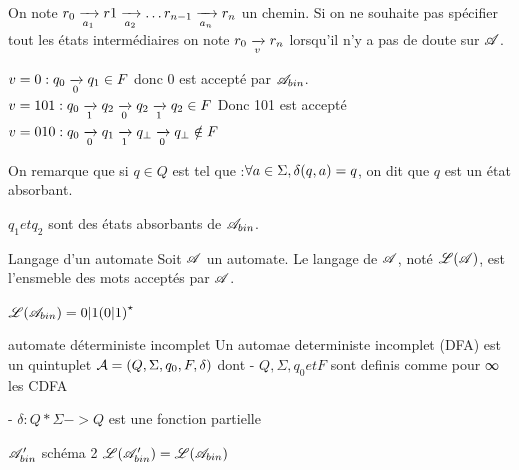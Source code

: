 \documentclass[a4paper,french,bookmarks]{book}
\begin{document}
    \begin{notation}
        \begin{enumerate}
            \itt On note $r_0\lima{a_1} r1 \lima{a_2} \dots r_{n - 1} \lima{a_n} r_n$ un chemin.
            \itt Si on ne souhaite pas spécifier tout les états intermédiaires on note $r_0 \lima{v} r_n$ lorsqu'il n'y a pas de doute sur $\mathscr{A}$.
        \end{enumerate}
    \end{notation}
    
    \begin{example}{}{}
        \begin{enumerate}
            \itt $v = 0 : q_0 \lima{0} q_1 \in F$ donc 0 est accepté par $\mathscr{A}_{bin}$.
            \itt $v = 101 : q_0 \lima{1} q_2 \lima{0} q_2 \lima{1} q_2 \in F$ Donc 101 est accepté
            \itt $v = 010 : q_0 \lima{0} q_1 \lima{1} q_\bot \lima{0} q_\bot \notin F$
        \end{enumerate}
    \end{example}
    
    On remarque que si $q \in Q$ est tel que :$\forall a \in \Sigma, \delta \!\left(q, a\right) = q$, on dit que $q$ est un état absorbant.
    
    \begin{example}{}{}
        $q_1 et q_2$ sont des états absorbants de $\mathscr{A}_{bin}$.
    \end{example}
    
    \begin{definition}{Langage d'un automate}{}
        Soit $\mathscr{A}$ un automate. Le langage de $\mathscr{A}$, noté $\mathscr{L} \!\left(\mathscr{A}\right)$, est l'ensmeble des mots acceptés par $\mathscr{A}$.
    \end{definition}
    
    \begin{example}{}{}
        $\mathscr{L} \!\left(\mathscr{A}_{bin}\right) = 0 \vert 1 \!\left(0 \vert 1\right)^\star$
    \end{example}
    
    \begin{definition}{automate déterministe incomplet}{}
        Un automae deterministe incomplet (DFA)
        est un quintuplet $\mathcal{A} = (Q,\Sigma, q_0, F, \delta)$ dont - $Q,
        \Sigma, q_0 et F$ sont definis comme pour ∞ les CDFA 
             
             - $\delta :  Q * \Sigma -> Q $ est une fonction partielle 
    \end{definition}
    
    \begin{example}{}{}
        $\mathscr{A}_{bin}'$ \newline
        schéma 2 \newline
        $\mathscr{L} \!\left(\mathscr{A}_{bin}'\right) = \mathscr{L} \!\left(\mathscr{A}_{bin}\right)$
    \end{example}
    
\end{document}

